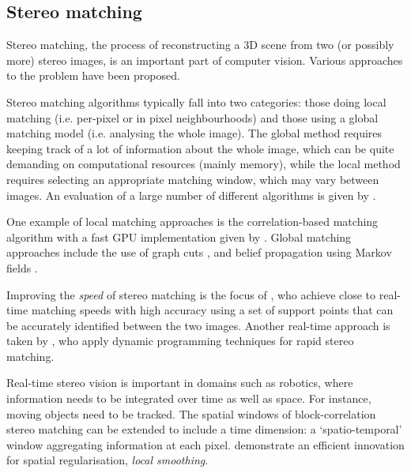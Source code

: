 \subsection{Stereo matching}
\label{sec:stereo-prior}

Stereo matching, the process of reconstructing a 3D scene from two (or possibly more) stereo
images, is an important part of computer vision. Various approaches to the
problem have been proposed.

Stereo matching algorithms typically fall into two categories: those doing local
matching (i.e. per-pixel or in pixel neighbourhoods) and those using a global
matching model (i.e. analysing the whole image). The global method requires
keeping track of a lot of information about the whole image, which can be quite
demanding on computational resources (mainly memory), while the local method
requires selecting an appropriate matching window, which may vary between
images. An evaluation of a large number of different algorithms is given by
\citet{scharstein02:_taxon_evaluat_dense_two_frame}.

One example of local matching approaches is the correlation-based matching
algorithm with a fast GPU implementation given by \citet{weber09}. Global
matching approaches include the use of graph cuts
\cite{kolmogorov01:_comput}, and belief propagation using Markov fields
\cite{felzenszwalb06:_effic_belief_propag_early_vision}.

Improving the \emph{speed} of stereo matching is the focus of
\citet{geiger11:_effic_large_scale_stereo_match}, who achieve close to real-time
matching speeds with high accuracy using a set of support points that can be
accurately identified between the two images. Another real-time approach is taken
by \citet{realtimestereo}, who apply dynamic programming techniques for rapid stereo matching.

Real-time stereo vision is important in domains such as robotics, where information needs to be integrated over time as well as space. For instance, moving objects need to be tracked. The spatial windows of block-correlation stereo matching can be extended to include a time dimension: a `spatio-temporal' window aggregating information at each pixel. \citet{tombari_konolige} demonstrate an efficient innovation for spatial regularisation, \emph{local smoothing}.

